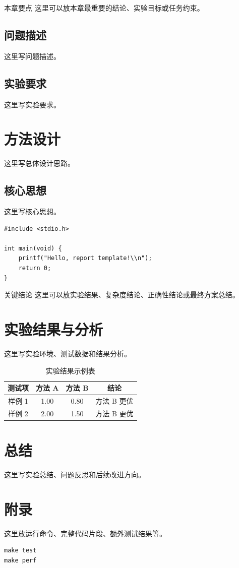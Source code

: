 \documentclass[UTF8,a4paper,12pt,openany]{ctexrep}
\begin{document}
\begin{keybox}{本章要点}
这里可以放本章最重要的结论、实验目标或任务约束。
\end{keybox}

\section{问题描述}
这里写问题描述。

\section{实验要求}
这里写实验要求。

\chapter{方法设计}
这里写总体设计思路。

\section{核心思想}
这里写核心思想。

\begin{lstlisting}[style=cstyle,caption={示例 C 代码}]
#include <stdio.h>

int main(void) {
    printf("Hello, report template!\\n");
    return 0;
}
\end{lstlisting}

\begin{resultbox}{关键结论}
这里可以放实验结果、复杂度结论、正确性结论或最终方案总结。
\end{resultbox}

\chapter{实验结果与分析}
这里写实验环境、测试数据和结果分析。

\begin{table}[H]
\centering
\caption{实验结果示例表}
\renewcommand{\arraystretch}{1.2}
\begin{tabular}{cccc}
\toprule
测试项 & 方法 A & 方法 B & 结论 \\
\midrule
样例 1 & 1.00 & 0.80 & 方法 B 更优 \\
样例 2 & 2.00 & 1.50 & 方法 B 更优 \\
\bottomrule
\end{tabular}
\end{table}

\chapter{总结}
这里写实验总结、问题反思和后续改进方向。

\appendix
\chapter{附录}
这里放运行命令、完整代码片段、额外测试结果等。

\begin{lstlisting}[style=bashstyle,caption={运行命令示例}]
make test
make perf
\end{lstlisting}
\end{document}
